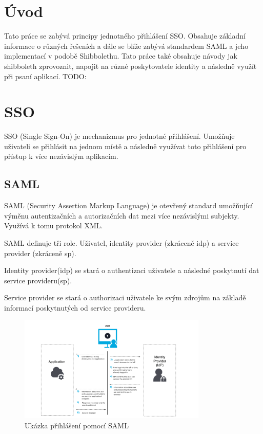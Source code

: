 \chapter{Úvod}
Tato práce se zabývá principy jednotného přihlášení SSO. Obsahuje základní informace o různých řešeních a dále se blíže zabývá standardem SAML a jeho implementací v podobě Shibbolethu. Tato práce také obsahuje návody jak shibboleth zprovoznit, napojit na různé poskytovatele identity a následně využít při psaní aplikací.
TODO:
\chapter{SSO}
\label{sso}
SSO (Single Sign-On) je mechanizmus pro jednotné přihlášení. Umožňuje uživateli se přihlásit na jednom místě a následně využívat toto přihlášení pro přístup k více nezávislým aplikacím. \cite{SSO}


\section{SAML}

SAML\cite{SAMLofficialSite}\cite{WhatIsSaml} (Security Assertion Markup Language) je otevřený standard umožňující výměnu autentizačních a autorizačních dat mezi více nezávislými subjekty. Využívá k tomu protokol XML. 

SAML definuje tři role. Uživatel, identity provider (zkráceně idp) a service provider (zkráceně sp). 

Identity provider(idp) se stará o authentizaci uživatele a následné poskytnutí dat service provideru(sp).

Service provider se stará o authorizaci uživatele ke svým zdrojům na základě informací poskytnutých od service provideru.

\begin{figure}[h]
	\centering
    \includegraphics[width=0.8\textwidth]{obrazky-figures/saml-flow.png}
	\caption{Ukázka přihlášení pomocí SAML\cite{SAMLxOIDC}}
	\label{saml-flow}
\end{figure}


